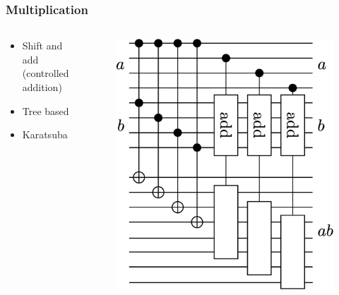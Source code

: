 \documentclass[utf8]{beamer}
\begin{document}
\begin{frame}
  \frametitle{Multiplication}
  \begin{columns}
    \begin{column}{5cm}
      \begin{itemize}
        \item Shift and add (controlled addition)
        \item Tree based 
        \item Karatsuba
      \end{itemize}
    \end{column}
    \begin{column}{5cm}
      \begin{figure} 
        \includegraphics[width=\linewidth]{diagrams/multCtrlAdd}
      \end{figure}
    \end{column}
  \end{columns}
\end{frame}
\end{document}
